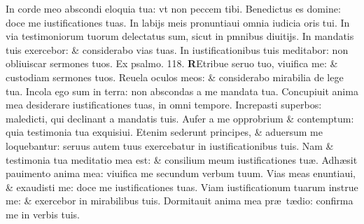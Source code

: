\documentclass[a5paper,10pt]{book}
\def\ae{æ}
\begin{document}
\begin{multicols*}{2}
\newline \color{red} I\color{black}n corde meo abscondi eloquia tua: vt non peccem tibi.
\newline \color{red} B\color{black}enedictus es domine: doce me iustificationes tuas.
\newline \color{red} I\color{black}n labijs meis pronuntiaui omnia iudicia oris tui.
\newline \color{red} I\color{black}n via testimoniorum tuorum delectatus sum, sicut in pmnibus diuitijs.
\newline \color{red} I\color{black}n mandatis tuis exercebor: \& considerabo vias tuas.
\newline \color{red} I\color{black}n iustificationibus tuis meditabor: non obliuiscar sermones tuos. 
\newline \color{red} Ex psalmo. \hypertarget{ps118.2}{118.} \color{black}
\vspace{+.25em}
\lettrine[lines=2]{\bfseries \color{red} R}{}Etribue seruo tuo, viuifica me: \& custodiam sermones tuos.
\newline \color{red} R\color{black}euela oculos meos: \& considerabo mirabilia de lege tua.
\newline \color{red} I\color{black}ncola ego sum in terra: non abscondas a me mandata tua.
\newline \color{red} C\color{black}oncupiuit anima mea desiderare iustificationes tuas, in omni tempore.
\newline \color{red} I\color{black}ncrepasti superbos: maledicti, qui declinant a mandatis tuis.
\newline \color{red} A\color{black}ufer a me opprobrium \& contemptum: quia testimonia tua exquisiui.
\newline \color{red} E\color{black}tenim sederunt principes, \& aduersum me loquebantur: seruus autem tuus exercebatur in iustificationibus tuis.
\newline \color{red} N\color{black}am \& testimonia tua meditatio mea est: \& consilium meum iustificationes tu\ae .
\newline \color{red} A\color{black}dh\ae sit pauimento anima mea: viuifica me secundum verbum tuum.
\newline \color{red} V\color{black}ias meas enuntiaui, \& exaudisti me: doce me iustificationes tuas.
\newline \color{red} V\color{black}iam iustificationum tuarum instrue me: \& exercebor in mirabilibus tuis.
\newline \color{red} D\color{black}ormitauit anima mea pr\ae \ t\ae dio: confirma me in verbis tuis.

\end{multicols*}
\end{document}
